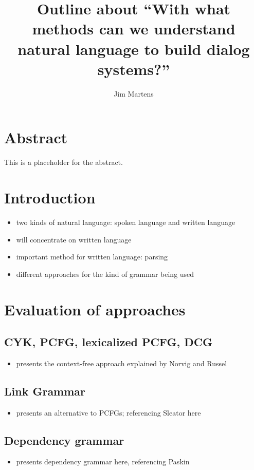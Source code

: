 \documentclass[10pt,a4paper,oneside,english,numbers=noenddot,titlepage]{scrartcl}
\begin{document}
\author{Jim Martens}
\title{Outline about ``With what methods can we understand natural language to build dialog systems?''}
\maketitle
\section*{Abstract}
	This is a placeholder for the abstract.
\tableofcontents
\clearpage

\section{Introduction}
	\begin{itemize}
		\item	two kinds of natural language: spoken language and written language
		\item	will concentrate on written language
		\item	important method for written language: parsing
		\item	different approaches for the kind of grammar being used
	\end{itemize}
\section{Evaluation of approaches}
	\subsection{CYK, PCFG, lexicalized PCFG, DCG}
		\begin{itemize}
			\item	presents the context-free approach explained by Norvig and Russel\cite{Russel2010}
		\end{itemize}
	\subsection{Link Grammar}
		\begin{itemize}
			\item	presents an alternative to PCFGs; referencing Sleator here\cite{Sleator1993}
		\end{itemize}
	\subsection{Dependency grammar}
		\begin{itemize}
			\item	presents dependency grammar here, referencing Paskin\cite{Paskin2001}
		\end{itemize}
\end{document}
